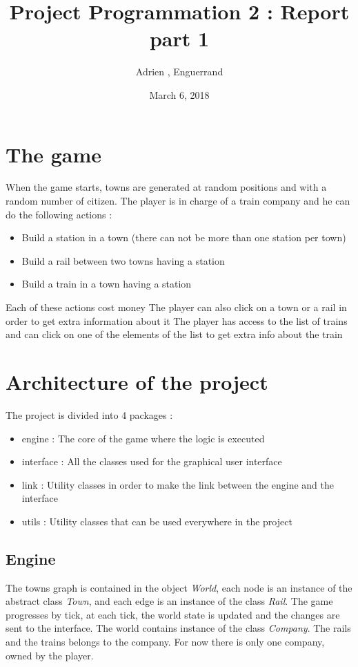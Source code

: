 \documentclass{article}
\title{Project Programmation 2 : Report part 1}
\author{Adrien \bsc{Bardes}, Enguerrand \bsc{Dezerces}}
\date{March 6, 2018}
\begin{document}
\maketitle

\section{The game}
When the game starts, towns are generated at random positions and with a random number of citizen. The player is in charge of a train company and he can do the following actions :
\begin{itemize}
	\item Build a station in a town (there can not be more than one station per town)
	\item Build a rail between two towns having a station
	\item Build a train in a town having a station
\end{itemize}
Each of these actions cost money
The player can also click on a town or a rail in order to get extra information about it
The player has access to the list of trains and can click on one of the elements of the list to get extra info about the train

\section{Architecture of the project}

The project is divided into 4 packages : 
\begin{itemize}
	\item engine : The core of the game where the logic is executed
	\item interface : All the classes used for the graphical user interface
	\item link : Utility classes in order to make the link between the engine and the interface
	\item utils : Utility classes that can be used everywhere in the project
\end{itemize}

\subsection{Engine}
The towns graph is contained in the object \textit{World}, each node is an instance of the abstract class \textit{Town}, and each edge is an instance of the class \textit{Rail}.
The game progresses by tick, at each tick, the world state is updated and the changes are sent to the interface.
The world contains instance of the class \textit{Company}.
The rails and the trains belongs to the company. 
For now there is only one company, owned by the player.
\end{document}
